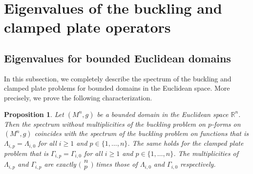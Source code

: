 \documentclass[pdftex]{sigma}
\numberwithin{equation}{section}
\newtheorem{Proposition}[Theorem]{Proposition}
\theoremstyle{definition}
\begin{document}
\section{Eigenvalues of the buckling and clamped plate operators}\label{s:ebs}

\subsection{Eigenvalues for bounded Euclidean domains}%

In this subsection, we completely describe the spectrum of the buckling and clamped plate problems for bounded domains in the Euclidean space. More precisely, we prove the following characterization.

\begin{Proposition}\label{BCP_Euclidean}
Let $(M^n,g)$ be a bounded domain in the Euclidean space $\mathbb{R}^n$.
Then the spectrum without multiplicities of the buckling problem on $p$-forms on $(M^n,g)$ coincides with the spectrum of the buckling problem on functions that is $\Lambda_{i,p}=\Lambda_{i,0}$ for all $i \geq 1$ and $p\in\{1,\dots,n\}$.
The same holds for the clamped plate problem that is $\Gamma_{i,p}=\Gamma_{i,0}$ for all $i \geq 1$ and $p\in\{1,\dots,n\}$.
The multiplicities of $\Lambda_{i,p}$ and $\Gamma_{i,p}$ are exactly $\bigl(\begin{smallmatrix}n\\ p\end{smallmatrix}\bigr)$ times those of $\Lambda_{i,0}$ and $\Gamma_{i,0}$ respectively.
\end{Proposition}
\end{document}
